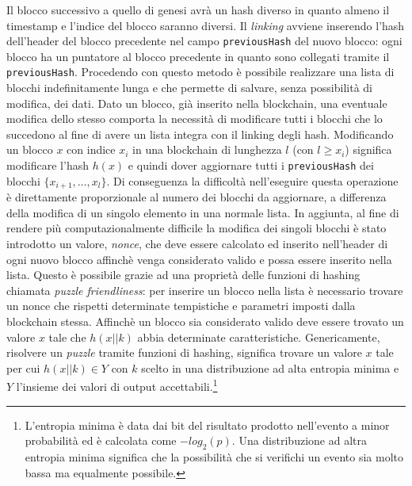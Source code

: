 \begin{enumerate}[1.]
\begin{table}[H]
{\begin{tabular}{|r|l|}
        \hline
    \end{tabular}}
\end{table}
Il blocco successivo a quello di genesi avrà un hash diverso in quanto almeno il timestamp e l'indice del blocco saranno diversi. Il \textit{linking} avviene inserendo l'hash dell'header del blocco precedente nel campo \texttt{previousHash} del nuovo blocco: ogni blocco ha un puntatore al blocco precedente in quanto sono collegati tramite il \texttt{previousHash}.\newline
Procedendo con questo metodo è possibile realizzare una lista di blocchi indefinitamente lunga e che permette di salvare, senza possibilità di modifica, dei dati. Dato un blocco, già inserito nella blockchain, una eventuale modifica dello stesso comporta la necessità di modificare tutti i blocchi che lo succedono al fine di avere un lista integra con il linking degli hash.\newline
Modificando un blocco $x$ con indice $x_i$ in una blockchain di lunghezza $l$ (con $l\ge x_i$) significa modificare l'hash $h(x)$ e quindi dover aggiornare tutti i \texttt{previousHash} dei blocchi $\{x_{i+1},\dots,x_l\}$. Di conseguenza la difficoltà nell'eseguire questa operazione è direttamente proporzionale al numero dei blocchi da aggiornare, a differenza della modifica di un singolo elemento in una normale lista.\newline
In aggiunta, al fine di rendere più computazionalmente difficile la modifica dei singoli blocchi è stato introdotto un valore, \textit{nonce}, che deve essere calcolato ed inserito nell'header di ogni nuovo blocco affinchè venga considerato valido e possa essere inserito nella lista. Questo è possibile grazie ad una proprietà delle funzioni di hashing chiamata \textit{puzzle friendliness}: per inserire un blocco nella lista è necessario trovare un nonce che rispetti determinate tempistiche e parametri imposti dalla blockchain stessa. Affinchè un blocco sia considerato valido deve essere trovato un valore $x$ tale che $h(x||k)$ abbia determinate caratteristiche.\newline
Genericamente, risolvere un \textit{puzzle} tramite funzioni di hashing, significa trovare un valore $x$ tale per cui $h(x||k)\in Y$ con $k$ scelto in una distribuzione ad alta entropia minima e $Y$ l'insieme dei valori di output accettabili.\footnote{L'entropia minima è data dai bit del risultato prodotto nell'evento a minor probabilità ed è calcolata come $-log_2(p)$. Una distribuzione ad altra entropia minima significa che la possibilità che si verifichi un evento sia molto bassa ma equalmente possibile.}\newline

\end{enumerate}
